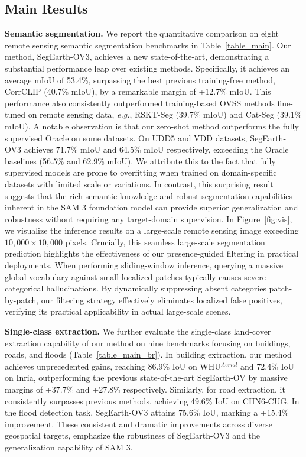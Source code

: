 \documentclass[twocolumn,switch,times]{article}
\newcommand{\samov}{SegEarth-OV\textcolor{cvprpink}{3}\xspace}
\begin{document}
\subsection{Main Results}

\noindent
\textbf{Semantic segmentation.}
We report the quantitative comparison on eight remote sensing semantic segmentation benchmarks in Table~\ref{table_main}. Our method, \samov, achieves a new state-of-the-art, demonstrating a substantial performance leap over existing methods. Specifically, it achieves an average mIoU of 53.4\%, surpassing the best previous training-free method, CorrCLIP (40.7\% mIoU), by a remarkable margin of +12.7\% mIoU. This performance also consistently outperformed training-based OVSS methods fine-tuned on remote sensing data, \textit{e.g.}, RSKT-Seg (39.7\% mIoU) and Cat-Seg (39.1\% mIoU). A notable observation is that our zero-shot method outperforms the fully supervised Oracle on some datasets. On UDD5 and VDD datasets, \samov achieves 71.7\% mIoU and 64.5\% mIoU respectively, exceeding the Oracle baselines (56.5\% and 62.9\% mIoU). We attribute this to the fact that fully supervised models are prone to overfitting when trained on domain-specific datasets with limited scale or variations. In contrast, this surprising result suggests that the rich semantic knowledge and robust segmentation capabilities inherent in the SAM 3 foundation model can provide superior generalization and robustness without requiring any target-domain supervision. In Figure~\ref{fig:vis}, we visualize the inference results on a large-scale remote sensing image exceeding $10,000 \times 10,000$ pixels.
Crucially, this seamless large-scale segmentation prediction highlights the effectiveness of our presence-guided filtering in practical deployments. When performing sliding-window inference, querying a massive global vocabulary against small localized patches typically causes severe categorical hallucinations. By dynamically suppressing absent categories patch-by-patch, our filtering strategy effectively eliminates localized false positives, verifying its practical applicability in actual large-scale scenes.


\noindent
\textbf{Single-class extraction.}
We further evaluate the single-class land-cover extraction capability of our method on nine benchmarks focusing on buildings, roads, and floods (Table~\ref{table_main_br}). In building extraction, our method achieves unprecedented gains, reaching 86.9\% IoU on WHU$^{Aerial}$ and 72.4\% IoU on Inria, outperforming the previous state-of-the-art SegEarth-OV by massive margins of +37.7\% and +27.8\% respectively. Similarly, for road extraction, it consistently surpasses previous methods, achieving 49.6\% IoU on CHN6-CUG. In the flood detection task, \samov attains 75.6\% IoU, marking a +15.4\% improvement. These consistent and dramatic improvements across diverse geospatial targets, emphasize the robustness of \samov and the generalization capability of SAM 3.
\end{document}

